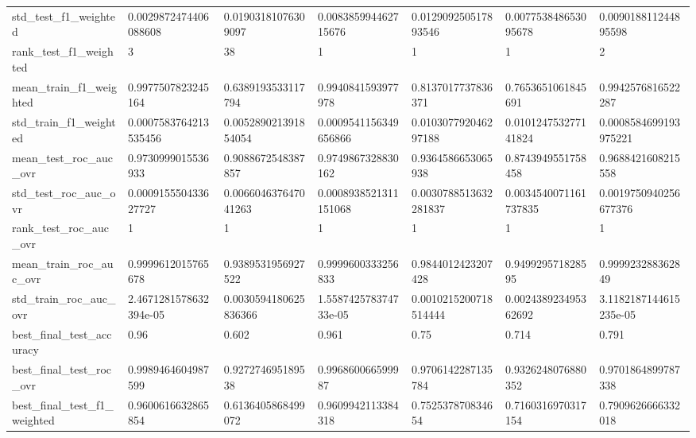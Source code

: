 \begin{tabular}{lllllll}
std\_test\_f1\_weighted        &   0.0029872474406088608 &    0.01903181076309097 &   0.008385994462715676 &   0.012909250517893546 &   0.007753848653095678 &    0.009018811244895598 \\
rank\_test\_f1\_weighted       &                       3 &                     38 &                      1 &                      1 &                      1 &                       2 \\
mean\_train\_f1\_weighted      &      0.9977507823245164 &     0.6389193533117794 &     0.9940841593977978 &     0.8137017737836371 &     0.7653651061845691 &      0.9942576816522287 \\
std\_train\_f1\_weighted       &   0.0007583764213535456 &   0.005289021391854054 &  0.0009541156349656866 &   0.010307792046297188 &   0.010124753277141824 &   0.0008584699193975221 \\
mean\_test\_roc\_auc\_ovr       &      0.9730999015536933 &     0.9088672548387857 &     0.9749867328830162 &     0.9364586653065938 &     0.8743949551758458 &      0.9688421608215558 \\
std\_test\_roc\_auc\_ovr        &    0.000915550433627727 &   0.006604637647041263 &  0.0008938521311151068 &  0.0030788513632281837 &  0.0034540071161737835 &   0.0019750940256677376 \\
rank\_test\_roc\_auc\_ovr       &                       1 &                      1 &                      1 &                      1 &                      1 &                       1 \\
mean\_train\_roc\_auc\_ovr      &      0.9999612015765678 &     0.9389531956927522 &     0.9999600333256833 &     0.9844012423207428 &      0.949929571828595 &       0.999923288362849 \\
std\_train\_roc\_auc\_ovr       &  2.4671281578632394e-05 &  0.0030594180625836366 &  1.558742578374733e-05 &  0.0010215200718514444 &   0.002438923495362692 &  3.1182187144615235e-05 \\
best\_final\_test\_accuracy    &                    0.96 &                  0.602 &                  0.961 &                   0.75 &                  0.714 &                   0.791 \\
best\_final\_test\_roc\_ovr     &      0.9989464604987599 &      0.927274695189538 &      0.996860066599987 &     0.9706142287135784 &     0.9326248076880352 &      0.9701864899787338 \\
best\_final\_test\_f1\_weighted &      0.9600616632865854 &     0.6136405868499072 &     0.9609942113384318 &      0.752537870834654 &     0.7160316970317154 &      0.7909626666332018 \\
\bottomrule
\end{tabular}
